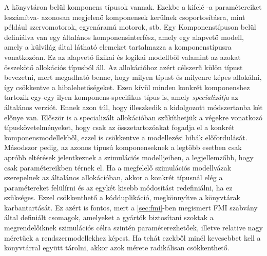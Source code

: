        A könyvtáron belül komponens típusok vannak. Ezekbe a kifelé -a paramétereiket leszámítva- azonosan megjelenő komponensek kerülnek csoportosításra, mint például szervomotorok, egyenáramú motorok, stb.
        Egy Komponenstípuson belül definiálva van egy általános komponensinterfész, amely egy alapvető modell, amely a külvilág által látható elemeket tartalmazza a komponenstípusra vonatkozóan. Ez az alapvető fizikai és logikai modellből valamint az azokat összekötő allokációs típusból áll.
        Az allokációhoz azért célszerű külön típust bevezetni, mert megadható benne, hogy milyen típust és milyenre képes allokálni, így csökkentve a hibalehetőségeket.
        Ezen kívül minden konkrét komponenshez tartozik egy-egy ilyen komponens-specifikus típus is, amely \emph{specializálja} az általános verziót.
        Ennek azon túl, hogy illeszkedik a kidolgozott módszertanba két előnye van.
        Először is a specializált allokációban szűkíthetjük a végekre vonatkozó típuskövetelményeket, hogy csak az összetartozóakat fogadja el a konkrét komponensmodellekből, ezzel is csökkentve a modellezési hibák előfordulását.
        Másodszor pedig, az azonos típusú komponenseknek a legtöbb esetben csak apróbb eltérések jelentkeznek a szimulációs modelljeiben, a legjellemzőbb, hogy csak paramétereikben térnek el.
        Ha a megfelelő szimulációs modellvázak szerepelnek az általános allokációban, akkor a konkrét típusnál elég a paramétereket felülírni és az egykét kisebb módosítást redefiniálni, ha ez szükséges.
        Ezzel csökkenthető a kódduplikáció, megkönnyítve a könyvtárak karbantartását. Ez azért is fontos, mert a \ref{sec:fmi}-ben megismert FMI szabvány által definiált csomagok, amelyeket a gyártók biztosítani szoktak a megrendelőiknek szimulációs célra szintén paraméterezhetőek, illetve relative nagy méretűek a rendszermodellekhez képest.
        Ha tehát ezekből minél kevesebbet kell a könyvtárral együtt tárolni, akkor azok mérete radikálisan csökkenthető.

